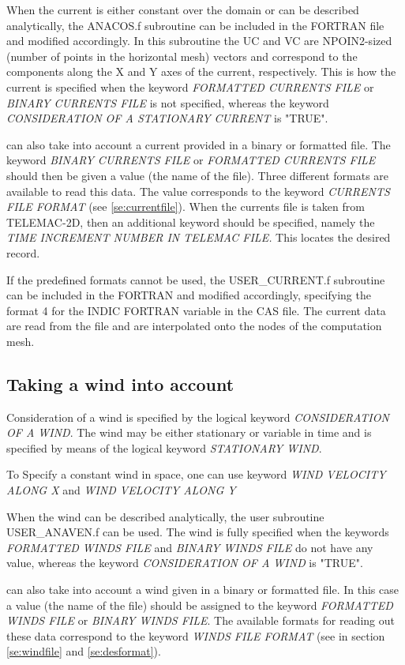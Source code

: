  When the current is either constant over the domain or can be described analytically, the ANACOS.f subroutine can be included in the
 FORTRAN file and modified accordingly. In this subroutine the UC and VC are NPOIN2-sized (number of points in the horizontal mesh)
 vectors and correspond to the components along the X and Y axes of the current, respectively. This is how the current is specified
 when the keyword \textit{FORMATTED CURRENTS FILE} or \textit{BINARY CURRENTS FILE }is not specified, whereas the keyword
 \textit{CONSIDERATION OF A STATIONARY CURRENT} is "TRUE".

 \tomawac can also take into account a current provided in a binary or formatted file. The keyword \textit{BINARY CURRENTS FILE} or
 \textit{FORMATTED CURRENTS FILE} should then be given a value (the name of the file). Three different formats are available to read
 this data. The value corresponds to the keyword \textit{CURRENTS FILE FORMAT} (see \ref{se:currentfile}). When the currents file is
 taken from TELEMAC-2D, then an additional keyword should be specified, namely the \textit{TIME INCREMENT NUMBER IN TELEMAC FILE.}
 This locates the desired record.

 If the predefined formats cannot be used, the USER\_CURRENT.f subroutine can be included in the FORTRAN and modified accordingly,
 specifying the format 4 for the INDIC FORTRAN variable in the CAS file. The current data are read from the file and are interpolated
 onto the nodes of the computation mesh.


\subsection{ Taking a wind into account}
\label{se:wind}
Consideration of a wind is specified by the logical keyword \textit{CONSIDERATION OF A WIND}. The wind may be either stationary or
variable in time and is specified by means of the logical keyword \textit{STATIONARY WIND}.

To Specify a constant wind in space, one can use keyword \textit{WIND VELOCITY ALONG X} and \textit{WIND VELOCITY ALONG Y}

When the wind can be described analytically, the user subroutine USER\_ANAVEN.f can be used. The wind is fully specified when the
keywords \textit{FORMATTED WINDS FILE} and \textit{BINARY WINDS FILE} do not have any value, whereas the keyword \textit{CONSIDERATION
  OF A WIND }is "TRUE".

\tomawac can also take into account a wind given in a binary or formatted file. In this case a value (the name of the file) should be
assigned to the keyword \textit{FORMATTED WINDS FILE }or \textit{BINARY WINDS FILE}. The available formats for reading out these data
correspond to the keyword \textit{WINDS FILE FORMAT} (see in section \ref{se:windfile} and \ref{se:desformat}).

